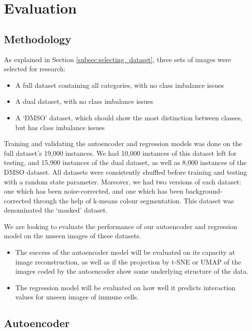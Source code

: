 \chapter{Evaluation}

\section{Methodology}

As explained in Section \ref{subsec:selecting_dataset}, three sets of images were selected for research:

\begin{itemize}
    \item A full dataset containing all categories, with no class imbalance issues
    \item A dual dataset, with no class imbalance issues
    \item A `DMSO' dataset, which should show the most distinction between classes, but has class imbalance issues
\end{itemize}

Training and validating the autoencoder and regression models was done on the full dataset's 19,000 instances. We had 10,000 instances of this dataset left for testing, and 15,900 instances of the dual dataset, as well as 8,000 instances of the DMSO dataset. All datasets were consistently shuffled before training and testing with a random state parameter. Moreover, we had two versions of each dataset: one which has been noise-corrected, and one which has been background-corrected through the help of k-means colour segmentation. This dataset was denominated the `masked' dataset.

We are looking to evaluate the performance of our autoencoder and regression model on the unseen images of these datasets.

\begin{itemize}
    \item The success of the autoencoder model will be evaluated on its capacity at image reconstruction, as well as if the projection by t-SNE or UMAP of the images coded by the autoencoder show some underlying structure of the data.
    \item The regression model will be evaluated on how well it predicts interaction values for unseen images of immune cells.
\end{itemize}

\section{Autoencoder}

